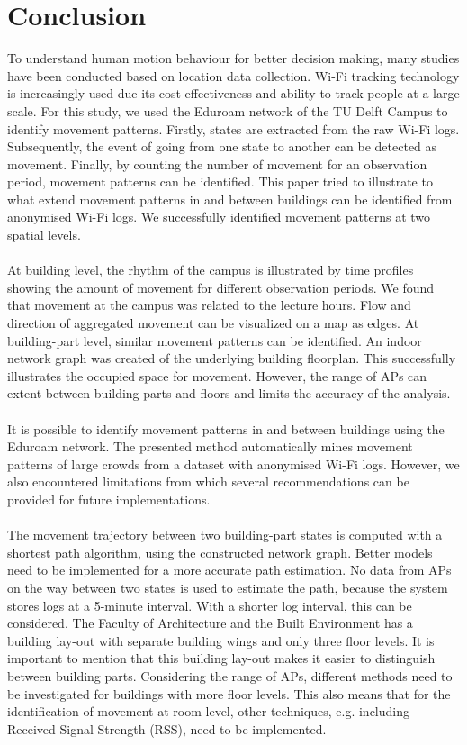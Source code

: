 \section{Conclusion}\label{5-conclusions}
To understand human motion behaviour for better decision making, many studies have been conducted based on location data collection. Wi-Fi tracking technology is increasingly used due its cost effectiveness and ability to track people at a large scale. For this study, we used the Eduroam network of the TU Delft Campus to identify movement patterns. Firstly, states are extracted from the raw Wi-Fi logs.  Subsequently, the event of going from one state to another can be detected as movement. Finally, by counting the number of movement for an observation period, movement patterns can be identified. This paper tried to illustrate to what extend movement patterns in and between buildings can be identified from anonymised Wi-Fi logs. We successfully identified movement patterns at two spatial levels. 
\\\\
At building level, the rhythm of the campus is illustrated by time profiles showing the amount of movement for different observation periods. We found that movement at the campus was related to the lecture hours. Flow and direction of aggregated movement can be visualized on a map as edges. At building-part level, similar movement patterns can be identified. An indoor network graph was created of the underlying building floorplan. This successfully illustrates the occupied space for movement. However, the range of APs can extent between building-parts and floors and limits the accuracy of the analysis. 
\\\\
It is possible to identify movement patterns in and between buildings using the Eduroam network. The presented method automatically mines movement patterns of large crowds from a dataset with anonymised Wi-Fi logs. However, we also encountered limitations from which several recommendations can be provided for future implementations.
\\\\
The movement trajectory between two building-part states is computed with a shortest path algorithm, using the constructed network graph. Better models need to be implemented for a more accurate path estimation. No data from APs on the way between two states is used to estimate the path, because the system stores logs at a 5-minute interval. With a shorter log interval, this can be considered. The Faculty of Architecture and the Built Environment has a building lay-out with separate building wings and only three floor levels. It is important to mention that this building lay-out makes it easier to distinguish between building parts. Considering the range of APs, different methods need to be investigated for buildings with more floor levels. This also means that for the identification of movement at room level, other techniques, e.g. including Received Signal Strength (RSS), need to be implemented. 
